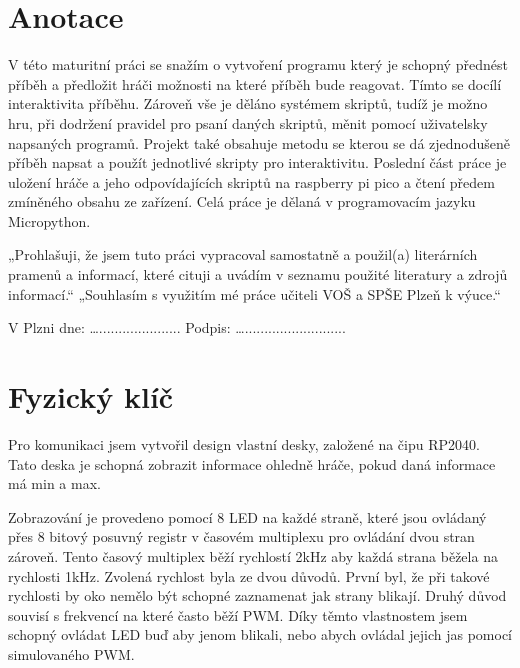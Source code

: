 \documentclass[12pt,a4paper]{article}
\begin{document}



\newpage

\section*{Anotace}
V této maturitní práci se snažím o vytvoření programu který je schopný přednést příběh a předložit hráči možnosti na které příběh bude reagovat. Tímto se docílí interaktivita příběhu. Zároveň vše je děláno systémem skriptů, tudíž je možno hru, při dodržení pravidel pro psaní daných skriptů, měnit pomocí uživatelsky napsaných programů. Projekt také obsahuje metodu se kterou se dá zjednodušeně příběh napsat a použít jednotlivé skripty pro interaktivitu. Poslední část práce je uložení hráče a jeho odpovídajících skriptů na raspberry pi pico a čtení předem zmíněného obsahu ze zařízení. Celá práce je dělaná v programovacím jazyku Micropython.


\vspace*{\fill}

„Prohlašuji, že jsem tuto práci vypracoval samostatně a použil(a) literárních pramenů a informací, které cituji a uvádím v seznamu použité literatury a zdrojů informací.“ 
„Souhlasím s využitím mé práce učiteli VOŠ a SPŠE Plzeň k výuce.“ 
\begin{flushright}
	V Plzni dne: …..................... Podpis: …..........................
\end{flushright} 

\newpage
\tableofcontents
\newpage
\section{Fyzický klíč}
Pro komunikaci jsem vytvořil design vlastní desky, založené na čipu RP2040. Tato deska je schopná zobrazit informace ohledně hráče, pokud daná informace má min a max. 

Zobrazování je provedeno pomocí 8 LED na každé straně, které jsou ovládaný přes 8 bitový posuvný registr v časovém multiplexu pro ovládání dvou stran zároveň. Tento časový multiplex běží rychlostí 2kHz aby každá strana běžela na rychlosti 1kHz. Zvolená rychlost byla ze dvou důvodů. První byl, že při takové rychlosti by oko nemělo být schopné zaznamenat jak strany blikají. Druhý důvod souvisí s frekvencí na které často běží PWM. Díky těmto vlastnostem jsem schopný ovládat LED buď aby jenom blikali, nebo abych ovládal jejich jas pomocí simulovaného PWM.  
\end{document}
